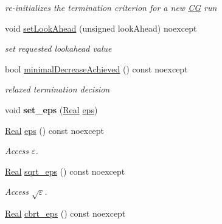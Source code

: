 \begin{DoxyCompactItemize}
\begin{DoxyCompactList}\small\item\em re-\/initializes the termination criterion for a new \hyperlink{namespaceSpacy_1_1CG}{C\-G} run \end{DoxyCompactList}\item 
void \hyperlink{classSpacy_1_1CG_1_1Termination_1_1StrakosTichyEnergyError_ac40343f544b7e2bfeffa7f7927cfeac5}{set\-Look\-Ahead} (unsigned look\-Ahead) noexcept
\begin{DoxyCompactList}\small\item\em set requested lookahead value \end{DoxyCompactList}\item 
bool \hyperlink{classSpacy_1_1CG_1_1Termination_1_1StrakosTichyEnergyError_af13fec942d9d9ec622803e226537ffec}{minimal\-Decrease\-Achieved} () const noexcept
\begin{DoxyCompactList}\small\item\em relaxed termination decision \end{DoxyCompactList}\item 
\hypertarget{classSpacy_1_1Mixin_1_1Eps_a818ab6dfab5e4eea583e1302bcc621f8}{void {\bfseries set\-\_\-eps} (\hyperlink{classSpacy_1_1Real}{Real} \hyperlink{classSpacy_1_1Mixin_1_1Eps_a812b99b0abc1d78a34b4114907f23f52}{eps})}\label{classSpacy_1_1Mixin_1_1Eps_a818ab6dfab5e4eea583e1302bcc621f8}

\item 
\hypertarget{classSpacy_1_1Mixin_1_1Eps_a812b99b0abc1d78a34b4114907f23f52}{\hyperlink{classSpacy_1_1Real}{Real} \hyperlink{classSpacy_1_1Mixin_1_1Eps_a812b99b0abc1d78a34b4114907f23f52}{eps} () const noexcept}\label{classSpacy_1_1Mixin_1_1Eps_a812b99b0abc1d78a34b4114907f23f52}

\begin{DoxyCompactList}\small\item\em Access $\varepsilon$. \end{DoxyCompactList}\item 
\hypertarget{classSpacy_1_1Mixin_1_1Eps_a1c1b0ed7f14ed4967dc7da9295a136d4}{\hyperlink{classSpacy_1_1Real}{Real} \hyperlink{classSpacy_1_1Mixin_1_1Eps_a1c1b0ed7f14ed4967dc7da9295a136d4}{sqrt\-\_\-eps} () const noexcept}\label{classSpacy_1_1Mixin_1_1Eps_a1c1b0ed7f14ed4967dc7da9295a136d4}

\begin{DoxyCompactList}\small\item\em Access $\sqrt\varepsilon$. \end{DoxyCompactList}\item 
\hypertarget{classSpacy_1_1Mixin_1_1Eps_a91dbe45e297be2bc53f1a96107a58c64}{\hyperlink{classSpacy_1_1Real}{Real} \hyperlink{classSpacy_1_1Mixin_1_1Eps_a91dbe45e297be2bc53f1a96107a58c64}{cbrt\-\_\-eps} () const noexcept}\label{classSpacy_1_1Mixin_1_1Eps_a91dbe45e297be2bc53f1a96107a58c64}


\end{DoxyCompactItemize}
